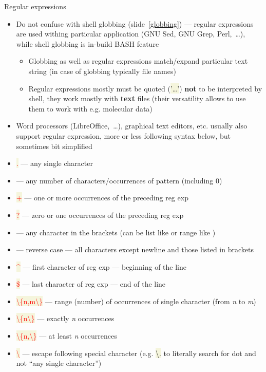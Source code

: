 \documentclass[compress, xelatex, 11pt, xcolor=svgnames, aspectratio=169,
	hyperref={
		bookmarks=true,
		unicode=true,
		colorlinks=true,
		pdftitle={Linux, command line and MetaCentrum},
		plainpages=false,
		pdfauthor={Vojtech Zeisek},
		pdfsubject={Course about use of Linux command line, writing shell scripts and using MetaCentrum of CESNET},
		pdfcreator={XeLaTeX},
		pdfkeywords={Linux, GNU, BASH, shell, command line, MetaCentrum},
		linkcolor=DarkRed, %
		anchorcolor=DarkBlue, %
		citecolor=Indigo, %
		filecolor=NavyBlue, %
		menucolor=DarkMagenta, %
		urlcolor=DarkBlue, %
		},
	url={hyphens, lowtilde} %
	]{beamer}
\renewcommand{\texttt}[1]{\colorbox{Beige}{{\ttfamily #1}}}
\renewcommand{\alert}[1]{\textcolor{red}{#1}}
\begin{document}
\begin{frame}[allowframebreaks]{Regular expressions}
\begin{itemize}
		\item Do not confuse with shell globbing (slide~\ref{globbing}) --- regular expressions are used withing particular application (GNU Sed, GNU Grep, Perl,~\ldots), while shell globbing is in-build BASH feature
		\begin{itemize}
			\item Globbing as well as regular expressions match/expand particular text string (in case of globbing typically file names)
			\item Regular expressions mostly must be quoted (\texttt{'\ldots'}) \textbf{not} to be interpreted by shell, they work mostly with \textbf{text} files (their versatility allows to use them to work with e.g. molecular data)
		\end{itemize}
		\item Word processors (LibreOffice,~\ldots), graphical text editors, etc. usually also support regular expression, more or less following syntax below, but sometimes bit simplified
		\item \alert{\texttt{.}} --- any single character
		\item \alert{\texttt{*}} --- any number of characters/occurrences of pattern (including 0)
		\item \alert{\texttt{+}} --- one or more occurrences of the preceding reg exp
		\item \alert{\texttt{?}} --- zero or one occurrences of the preceding reg exp
		\item \alert{\texttt{[\ldots]}} --- any character in the brackets (can be list like \texttt{[abcd]} or range like \texttt{[a-kxz4-8\_-]})
		\item \alert{\texttt{[\textasciicircum\ldots]}} --- reverse case --- all characters except newline and those listed in brackets
		\item \alert{\texttt{\textasciicircum}} --- first character of reg exp --- beginning of the line
		\item \alert{\texttt{\$}} --- last character of reg exp --- end of the line
		\item \alert{\texttt{\textbackslash\{n,m\textbackslash\}}} --- range (number) of occurrences of single character (from \textit{n} to \textit{m})
		\item \alert{\texttt{\textbackslash\{n\textbackslash\}}} --- exactly \textit{n} occurrences
		\item \alert{\texttt{\textbackslash\{n,\textbackslash\}}} --- at least \textit{n} occurrences
		\item \alert{\texttt{\textbackslash}} --- escape following special character (e.g. \texttt{\textbackslash .} to literally search for dot and not \enquote{any single character})

\end{itemize}
\end{frame}
\end{document}
